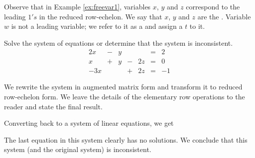 \documentclass{ximera}
\begin{document}
Observe that in Example \ref{ex:freevar1}, variables $x$, $y$ and $z$ correspond to the leading $1's$ in the reduced row-echelon.  We say that $x$, $y$ and $z$ are the .  Variable $w$ is not a leading variable; we refer to it as a  and assign a  $t$ to it.

\begin{example}\label{ex:nosolutionssys}
Solve the system of equations or determine that the system is inconsistent.
$$\begin{array}{ccccccc}
      2x & -&y&&&= &2 \\
	 x& +&y&-&2z&=&0\\
     -3x& &&+&2z&=&-1
    \end{array}$$
    
    \begin{explanation}
    We rewrite the system in augmented matrix form and transform it to reduced row-echelon form.  We leave the details of the elementary row operations to the reader and state the final result.
    
    
 Converting back to a system of linear equations, we get
 
    The last equation in this system clearly has no solutions.  We conclude that this system (and the original system) is inconsistent.
    \end{explanation}
    
\end{example}
\end{document}
